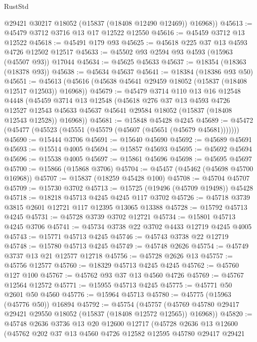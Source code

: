 \begin{lexlean}{RustStd}
\begin{coremodule}
        @29421
        @30217
        @18052
        (@15837 (@18408 @12490 @12469))
        @16968))
@45613 := @45479 @3712 @3716 @13 @17 @12522 @12550
@45616 := @45459 @3712 @13 @12522
@45618 := @45491 @179 @93
@45625 := @45618 @225 @37 @13 @4593 @4726 @12502 @12517
@45633 := @45502 @93 @2594 @93 @4593 (@15963 (@45507 @93)) @17044
@45634 := @45625 @45633
@45637 := @18354 (@18363 (@18378 @93))
@45638 := @45634 @45637
@45641 := @18384 (@18386 @93 @50)
@45651 := @45613 (@45616 (@45638 @45641 @29459 @18052 (@15837 (@18408 @12517 @12503)) @16968))
@45679 := @45479
    @3714
    @110
    @13
    @16
    @12548
    @4448
    (@45459
      @3714
      @13
      @12548
      (@45618
        @276
        @37
        @13
        @4593
        @4726
        @12527
        @12543
        @45633
        @45637
        @45641
        @29584
        @18052
        (@15837 (@18408 @12543 @12528))
        @16968))
@45681 := @15848 @45428 @4245
@45689 := @45472 (@45477 (@45523 (@45551 (@45579 (@45607 (@45651 (@45679 @45681)))))))
@45690 := @15444 @3706
@45691 := @15640 @45690
@45692 := @45689 @45691
@45693 := @15514 @4005
@45694 := @15857 @45693
@45695 := @45692 @45694
@45696 := @15538 @4005
@45697 := @15861 @45696
@45698 := @45695 @45697
@45700 := @15866 (@15868 @3706)
@45704 := @45457 (@45462 (@45698 @45700 @16968))
@45707 := @15837 (@18259 @45428 @100)
@45708 := @45704 @45707
@45709 := @15730 @3702
@45713 := @15725 (@19496 (@45709 @19498)) @45428
@45718 := @18218 @45713 @4245 @4245 @117 @3702
@45726 := @45718 @3739 @3815 @2601 @12721 @117 @12395 @13065 @13388
@45728 := @15792 @45713 @4245
@45731 := @45728 @3739 @3702 @12721
@45734 := @15801 @45713 @4245 @3706
@45741 := @45734 @3738 @22 @3702 @4433 @12719 @4245 @4005
@45743 := @15771 @45713 @4245
@45746 := @45743 @3738 @22 @12719
@45748 := @15780 @45713 @4245
@45749 := @45748 @2626
@45754 := @45749 @3737 @13 @21 @12577 @12718
@45756 := @45728 @2626 @13
@45757 := @45756 @12577
@45760 := @18329 @45713 @4245 @4245
@45762 := @45760 @127 @100
@45767 := @45762 @93 @37 @13 @4560 @4726
@45769 := @45767 @12564 @12572
@45771 := @15955 @45713 @4245
@45775 := @45771 @50 @2601 @50 @4560
@45776 := @15964 @45713
@45780 := @45775 (@15963 (@45776 @50)) @16894
@45792 := @45754
    (@45757 (@45769 @45780 @29417 @29421 @29550 @18052 (@15837 (@18408 @12572 @12565)) @16968))
@45820 := @45748
    @2636
    @3736
    @13
    @20
    @12600
    @12717
    (@45728
      @2636
      @13
      @12600
      (@45762
        @202
        @37
        @13
        @4560
        @4726
        @12582
        @12595
        @45780
        @29417
        @29421

\end{coremodule}
\end{lexlean}
